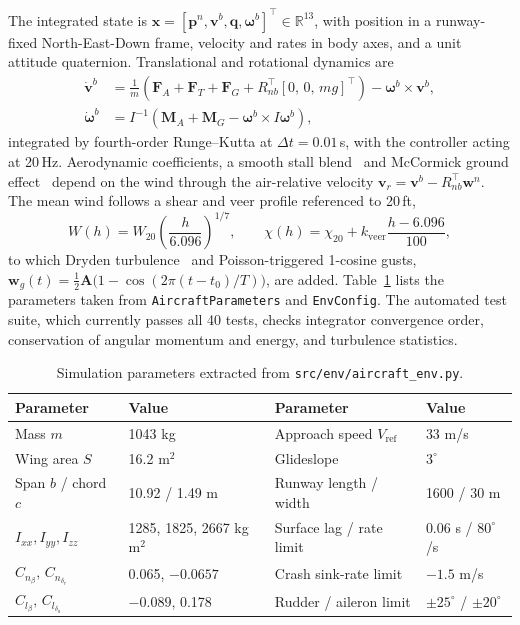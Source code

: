 \documentclass[10pt,a4paper]{article}
\begin{document}
The integrated state is
\(\mathbf{x}=[\mathbf{p}^n,\mathbf{v}^b,\mathbf{q},\boldsymbol{\omega}^b]^\top\in\mathbb{R}^{13}\),
with position in a runway-fixed North-East-Down frame, velocity and rates in body
axes, and a unit attitude quaternion. Translational and rotational dynamics are
\begin{align}
\dot{\mathbf{v}}^b &= \frac{1}{m}\left(\mathbf{F}_A+\mathbf{F}_T+\mathbf{F}_G
 + R_{nb}^\top[0,\,0,\,mg]^\top\right)-\boldsymbol{\omega}^b\times\mathbf{v}^b, \label{eq:trans}\\
\dot{\boldsymbol{\omega}}^b &= I^{-1}\left(\mathbf{M}_A+\mathbf{M}_G-\boldsymbol{\omega}^b\times I\boldsymbol{\omega}^b\right), \label{eq:rot}
\end{align}
integrated by fourth-order Runge--Kutta at \(\Delta t=0.01\)\,s, with the controller
acting at 20\,Hz. Aerodynamic coefficients, a smooth stall blend~\cite{beard2012}
and McCormick ground effect~\cite{mccormick1995} depend on the wind through the
air-relative velocity \(\mathbf{v}_r=\mathbf{v}^b-R_{nb}^\top\mathbf{w}^n\). The
mean wind follows a shear and veer profile referenced to 20\,ft,
\begin{equation}
W(h)=W_{20}\left(\frac{h}{6.096}\right)^{1/7},\qquad
\chi(h)=\chi_{20}+k_{\mathrm{veer}}\frac{h-6.096}{100},
\label{eq:shear}
\end{equation}
to which Dryden turbulence~\cite{milf8785c} and Poisson-triggered 1-cosine gusts,
\(\mathbf{w}_g(t)=\tfrac{1}{2}\mathbf{A}\bigl(1-\cos(2\pi(t-t_0)/T)\bigr)\), are
added. Table~\ref{tab:params} lists the parameters taken from
\texttt{AircraftParameters} and \texttt{EnvConfig}. The automated test suite, which
currently passes all 40 tests, checks integrator convergence order, conservation of
angular momentum and energy, and turbulence statistics.

\begin{table}[H]
\centering
\caption{Simulation parameters extracted from \texttt{src/env/aircraft\_env.py}.}
\label{tab:params}
\small
\begin{tabular}{@{}llll@{}}
\toprule
Parameter & Value & Parameter & Value\\
\midrule
Mass \(m\) & 1043 kg & Approach speed \(V_{\mathrm{ref}}\) & 33 m/s\\
Wing area \(S\) & 16.2 m\(^2\) & Glideslope & \(3^\circ\)\\
Span \(b\) / chord \(c\) & 10.92 / 1.49 m & Runway length / width & 1600 / 30 m\\
\(I_{xx},I_{yy},I_{zz}\) & 1285, 1825, 2667 kg\,m\(^2\) & Surface lag / rate limit & 0.06 s / \(80^\circ\)/s\\
\(C_{n_\beta},\,C_{n_{\delta_r}}\) & 0.065, \(-0.0657\) & Crash sink-rate limit & \(-1.5\) m/s\\
\(C_{l_\beta},\,C_{l_{\delta_a}}\) & \(-0.089\), 0.178 & Rudder / aileron limit & \(\pm25^\circ\) / \(\pm20^\circ\)\\
\bottomrule
\end{tabular}
\end{table}
\end{document}

